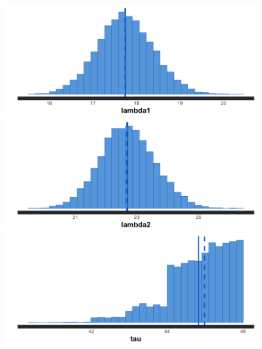 \documentclass[12pt, a4paper, oneside]{extreport}
\theoremstyle{plain}              %
\theoremstyle{definition}         %
\begin{document}
\begin{figure}[H]
	\begin{minipage}[H]{0.47\linewidth}
		\begin{center}
			\includegraphics[scale=0.22]{poiss_lambda1.png}
		\end{center}
	\end{minipage}
	\begin{minipage}[H]{0.47\linewidth}
		\begin{center}
			\includegraphics[scale=0.22]{poiss_lambda2.png}
		\end{center}
	\end{minipage}
\begin{minipage}[H]{0.47\linewidth}
	\begin{center}
			\includegraphics[scale=0.22]{poiss_tau.png}
	\end{center}
\end{minipage}
\end{figure}
\end{document}
